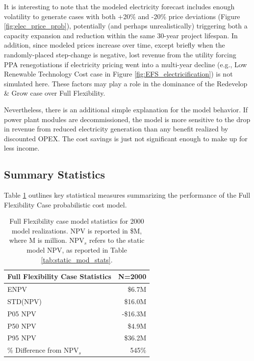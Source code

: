 It is interesting to note that the modeled electricity forecast includes enough volatility to generate cases with both +20\% and -20\% price deviations (Figure \ref{fig:elec_price_prob}), potentially (and perhaps unrealistically) triggering both a capacity expansion and reduction within the same 30-year project lifespan. In addition, since modeled prices increase over time, except briefly when the randomly-placed step-change is negative, lost revenue from the utility forcing PPA renegotiations if electricity pricing went into a multi-year decline (e.g., Low Renewable Technology Cost case in Figure \ref{fig:EFS_electricification}) is not simulated here. These factors may play a role in the dominance of the Redevelop \& Grow case over Full Flexibility.

Nevertheless, there is an additional simple explanation for the model behavior. If power plant modules are decommissioned, the model is more sensitive to the drop in revenue from reduced electricity generation than any benefit realized by discounted OPEX. The cost savings is just not significant enough to make up for less income.

\subsection{Summary Statistics}\label{ch6:reduce_stats}
Table \ref{tab:reduce_stats} outlines key statistical measures summarizing the performance of the Full Flexibility Case probabilistic cost model.

\begin{table}[H]
\centering
\begin{tabular}{|l|r|}
\hline
\textbf{Full Flexibility Case Statistics} & N=2000 \\ \hline
ENPV & \$6.7M \\ \hline
STD(NPV) & \$16.0M \\ \hline
P05 NPV & -\$16.3M \\ \hline
P50 NPV & \$4.9M \\ \hline
P95 NPV & \$36.2M \\ \hline
\% Difference from NPV$_{s}$ & 545\% \\ \hline
\end{tabular}
\caption[Full Flexibility Case statistics]{Full Flexibility case model statistics for 2000 model realizations. NPV is reported in \$M, where M is million. NPV$_s$ refers to the static model NPV, as reported in Table \ref{tab:static_mod_stats}.}
\label{tab:reduce_stats}
\end{table}

